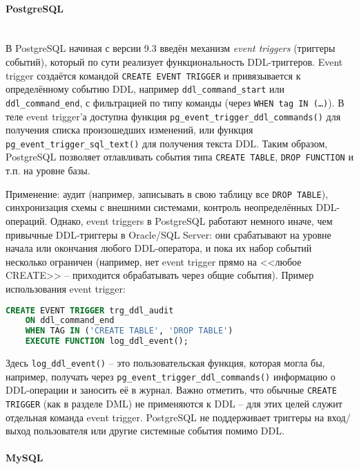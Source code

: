 \paragraph{\textbf{PostgreSQL}} ~\\

 В PostgreSQL начиная с версии 9.3 введён механизм \textit{event triggers} (триггеры событий), который по сути реализует функциональность DDL-триггеров. Event trigger создаётся командой \texttt{CREATE EVENT TRIGGER} и привязывается к определённому событию DDL, например \texttt{ddl\_command\_start} или \texttt{ddl\_command\_end}, с фильтрацией по типу команды (через \texttt{WHEN tag IN (\ldots)}). В теле event trigger’а доступна функция \texttt{pg\_event\_trigger\_ddl\_commands()} для получения списка произошедших изменений, или функция \texttt{pg\_event\_trigger\_sql\_text()} для получения текста DDL. Таким образом, PostgreSQL позволяет отлавливать события типа \texttt{CREATE TABLE}, \texttt{DROP FUNCTION} и т.п. на уровне базы. 

 Применение: аудит (например, записывать в свою таблицу все \texttt{DROP TABLE}), синхронизация схемы с внешними системами, контроль неопределённых DDL-операций. Однако, event triggers в PostgreSQL работают немного иначе, чем привычные DDL-триггеры в Oracle/SQL Server: они срабатывают на уровне начала или окончания любого DDL-оператора, и пока их набор событий несколько ограничен (например, нет event trigger прямо на <<любое CREATE>> – приходится обрабатывать через общие события). Пример использования event trigger:

 \begin{lstlisting}[language=SQL]
    CREATE EVENT TRIGGER trg_ddl_audit
    ON ddl_command_end
    WHEN TAG IN ('CREATE TABLE', 'DROP TABLE')
    EXECUTE FUNCTION log_ddl_event();
 \end{lstlisting}

 Здесь \texttt{log\_ddl\_event()} – это пользовательская функция, которая могла бы, например, получать через \texttt{pg\_event\_trigger\_ddl\_commands()} информацию о DDL-операции и заносить её в журнал. Важно отметить, что обычные \texttt{CREATE TRIGGER} (как в разделе DML) не применяются к DDL – для этих целей служит отдельная команда event trigger. PostgreSQL не поддерживает триггеры на вход/выход пользователя или другие системные события помимо DDL.

\paragraph{\textbf{MySQL}} ~\\

